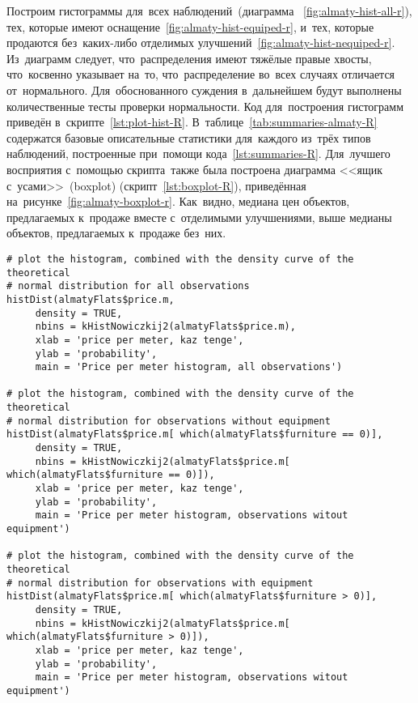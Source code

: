\documentclass[]{scrartcl}
\begin{document}
Построим гистограммы для~всех наблюдений~(диаграмма ~\ref{fig:almaty-hist-all-r}), тех, которые имеют оснащение~\ref{fig:almaty-hist-equiped-r}, и~тех, которые продаются без~каких-либо отделимых улучшений~\ref{fig:almaty-hist-nequiped-r}. Из~диаграмм следует, что~распределения имеют тяжёлые правые хвосты, что~косвенно указывает на~то, что~распределение во~всех случаях отличается от~нормального. Для~обоснованного суждения в~дальнейшем будут выполнены количественные тесты проверки нормальности. Код для~построения гистограмм приведён в~скрипте~\ref{lst:plot-hist-R}. В~таблице~\ref{tab:summaries-almaty-R} содержатся базовые описательные статистики для~каждого из~трёх типов наблюдений, построенные при~помощи кода~\ref{lst:summaries-R}. Для~лучшего восприятия с~помощью скрипта~также была построена диаграмма <<ящик с~усами>>~(\foreignlanguage{english}{boxplot}) (скрипт~\ref{lst:boxplot-R}), приведённая на~рисунке~\ref{fig:almaty-boxplot-r}. Как~видно, медиана цен объектов, предлагаемых к~продаже вместе с~отделимыми улучшениями, выше медианы объектов, предлагаемых к~продаже без~них. 
%
\begin{lstlisting}[float, caption = Построение гистограмм для~наблюдений различных типов, firstnumber=1, label= lst:plot-hist-R]
# plot the histogram, combined with the density curve of the theoretical
# normal distribution for all observations
histDist(almatyFlats$price.m,
     density = TRUE,
     nbins = kHistNowiczkij2(almatyFlats$price.m),
     xlab = 'price per meter, kaz tenge',
     ylab = 'probability',
     main = 'Price per meter histogram, all observations')
     
# plot the histogram, combined with the density curve of the theoretical
# normal distribution for observations without equipment
histDist(almatyFlats$price.m[ which(almatyFlats$furniture == 0)],
     density = TRUE,
     nbins = kHistNowiczkij2(almatyFlats$price.m[ which(almatyFlats$furniture == 0)]),
     xlab = 'price per meter, kaz tenge',
     ylab = 'probability',
     main = 'Price per meter histogram, observations witout equipment')
     
# plot the histogram, combined with the density curve of the theoretical
# normal distribution for observations with equipment
histDist(almatyFlats$price.m[ which(almatyFlats$furniture > 0)],
     density = TRUE,
     nbins = kHistNowiczkij2(almatyFlats$price.m[ which(almatyFlats$furniture > 0)]),
     xlab = 'price per meter, kaz tenge',
     ylab = 'probability',
     main = 'Price per meter histogram, observations witout equipment')
\end{lstlisting}
\end{document}
